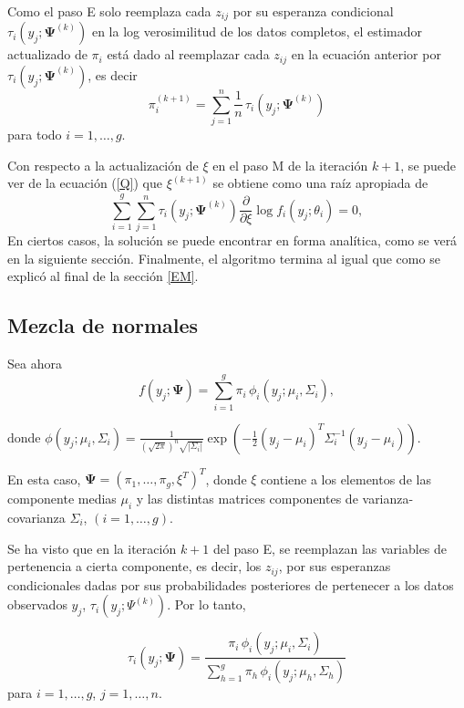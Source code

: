 \documentclass[
]{article}
\begin{document}
Como el paso E solo reemplaza cada \(z_{ij}\) por su esperanza
condicional \(\tau_i(y_j;\bm{\Psi}^{(k)})\) en la log verosimilitud de
los datos completos, el estimador actualizado de \(\pi_i\) está dado al
reemplazar cada \(z_{ij}\) en la ecuación anterior por
\(\tau_i(y_j;\bm{\Psi}^{(k)})\), es decir \begin{equation}
\pi_i^{(k+1)}=\sum_{j=1}^n \frac{1}{n} \, \tau_i(y_j;\bm{\Psi}^{(k)})\label{pi}
\end{equation} para todo \(i=1,\ldots,g\).

Con respecto a la actualización de \(\xi\) en el paso M de la iteración
\(k+1\), se puede ver de la ecuación (\ref{Q}) que \(\xi^{(k+1)}\) se
obtiene como una raíz apropiada de \begin{equation}
\sum_{i=1}^g \sum_{j=1}^n \tau_i(y_j;{\bm{\Psi}}^{(k)}) \frac{\partial}{\partial \xi} \log f_i(y_j;\theta_i)=0,
\end{equation} En ciertos casos, la solución se puede encontrar en forma
analítica, como se verá en la siguiente sección. Finalmente, el
algoritmo termina al igual que como se explicó al final de la sección
\ref{EM}.

\subsection{Mezcla de normales}

Sea ahora \begin{equation}
f(y_j;\bm{\Psi})=\sum_{i=1}^{g}\pi_i \, \phi_i(y_j;\mu_i,\Sigma_i),
\end{equation}

donde
\(\phi(y_j;\mu_i,\Sigma_i)={\frac{1}{{ (\sqrt{2\pi} )}^{n} \sqrt{|\Sigma_i|}}} \exp(-\frac{1}{2}(y_j-\mu_i)^T\Sigma_i^{-1}(y_j-\mu_i))\).

En esta caso, \(\bm{\Psi}=(\pi_1,\dots,\pi_g,\xi^T)^T\), donde \(\xi\)
contiene a los elementos de las componente medias \(\mu_i\) y las
distintas matrices componentes de varianza-covarianza \(\Sigma_i\),
\((i=1,\ldots,g)\).

Se ha visto que en la iteración \(k+1\) del paso E, se reemplazan las
variables de pertenencia a cierta componente, es decir, los \(z_{ij}\),
por sus esperanzas condicionales dadas por sus probabilidades
posteriores de pertenecer a los datos observados \(y_j\),
\(\tau_i(y_j;\Psi^{(k)})\). Por lo tanto,

\begin{equation}
\tau_i( y_j;\bm{\Psi} ) 
=\frac{ \pi_i \, \phi_i( y_j;\mu_i,\Sigma_i)}{\sum_{h=1}^g \pi_h \, \phi_i(y_j;\mu_h,\Sigma_h)}
\end{equation} para \(i=1,\ldots,g\), \(j=1,\ldots,n\).
\end{document}
